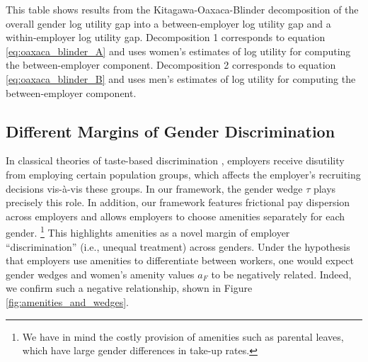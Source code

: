 %
\begin{table}[htbp!]
    \caption{Alternative Kitagawa-Oaxaca-Blinder decompositions of the gender gap in utility}
    \label{tab:kob_utility}
    \resizebox{\textwidth}{!}{%
    
    }
    \begin{tablenotes}
        \footnotesize
        This table shows results from the Kitagawa-Oaxaca-Blinder decomposition of the overall gender log utility gap into a between-employer log utility gap and a within-employer log utility gap. Decomposition 1 corresponds to equation \eqref{eq:oaxaca_blinder_A} and uses women's estimates of log utility for computing the between-employer component. Decomposition 2 corresponds to equation \eqref{eq:oaxaca_blinder_B} and uses men's estimates of log utility for computing the between-employer component. %
    \end{tablenotes}
    \begin{tablenotes}[Source]
        \sourcemodel%
    \end{tablenotes}
\end{table}
%


\subsection{Different Margins of Gender Discrimination\label{subsec:amenities_wedges}}

In classical theories of taste-based discrimination \citep[e.g.,][]{becker1971}, employers receive disutility from employing certain population groups, which affects the employer's recruiting decisions vis-{\`{a}}-vis these groups. In our framework, the gender wedge $\tau$ plays precisely this role. In addition, our framework features frictional pay dispersion across employers and allows employers to choose amenities separately for each gender.%
%
\footnote{We have in mind the costly provision of amenities such as parental leaves, which have large gender differences in take-up rates.} %
%
This highlights amenities as a novel margin of employer ``discrimination'' (i.e., unequal treatment) across genders. Under the hypothesis that employers use amenities to differentiate between workers, one would expect gender wedges and women's amenity values $a_{F}$ to be negatively related. Indeed, we confirm such a negative relationship, shown in Figure \ref{fig:amenities_and_wedges}.

